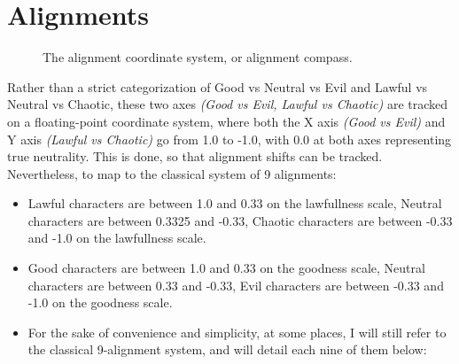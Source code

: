 \section{Alignments}
\begin{figure}[h]
\captionsetup{justification=centering}
\begin{center}
  \caption{The alignment coordinate system, or alignment compass.}
  \end{center}
\end{figure}
Rather than a strict categorization of Good vs Neutral vs Evil and Lawful vs Neutral vs Chaotic, these two axes \textit{(Good vs Evil, Lawful vs Chaotic)} are tracked on a floating-point coordinate system, where both the X axis \textit{(Good vs Evil)} and Y axis \textit{(Lawful vs Chaotic)} go from 1.0 to -1.0, with 0.0 at both axes representing true neutrality. This is done, so that alignment shifts can be tracked. Nevertheless, to map to the classical system of 9 alignments:
\begin{itemize}
\item Lawful characters are between 1.0 and 0.33 on the lawfullness scale, Neutral characters are between 0.3325 and -0.33, Chaotic characters are between -0.33 and -1.0 on the lawfullness scale.
\item Good characters are between 1.0 and 0.33 on the goodness scale, Neutral characters are between 0.33 and -0.33, Evil characters are between -0.33 and -1.0 on the goodness scale.
\item For the sake of convenience and simplicity, at some places, I will still refer to the classical 9-alignment system, and will detail each nine of them below:
\end{itemize}
